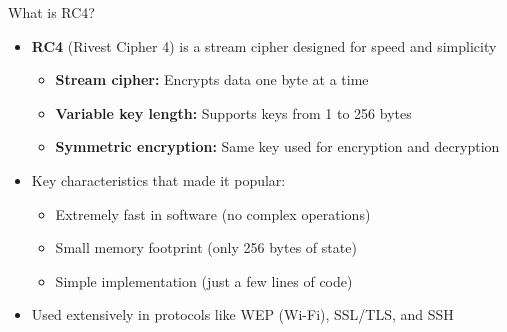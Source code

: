 \documentclass[aspectratio=169, lualatex, handout]{beamer}
\begin{document}
\begin{frame}{What is RC4?}
	\begin{itemize}[<+->]
		\item \textbf{RC4} (Rivest Cipher 4) is a stream cipher designed for speed and simplicity
		      \begin{itemize}[<+->]
			      \item \textbf{Stream cipher:} Encrypts data one byte at a time
			      \item \textbf{Variable key length:} Supports keys from 1 to 256 bytes
			      \item \textbf{Symmetric encryption:} Same key used for encryption and decryption
		      \end{itemize}
		\item Key characteristics that made it popular:
		      \begin{itemize}[<+->]
			      \item Extremely fast in software (no complex operations)
			      \item Small memory footprint (only 256 bytes of state)
			      \item Simple implementation (just a few lines of code)
		      \end{itemize}
		\item Used extensively in protocols like WEP (Wi-Fi), SSL/TLS, and SSH
	\end{itemize}
\end{frame}
\end{document}

